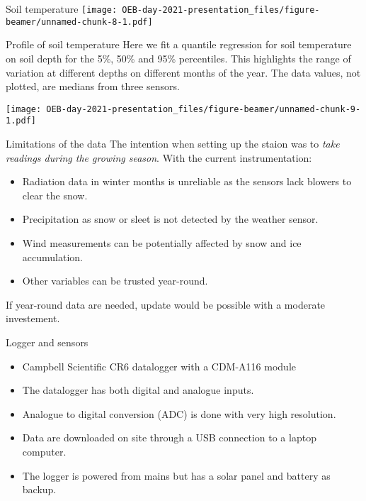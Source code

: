 \documentclass[
  ignorenonframetext,
]{beamer}
\providecommand{\tightlist}{%
  \setlength{\itemsep}{0pt}\setlength{\parskip}{0pt}}
\begin{document}
\begin{frame}{Soil temperature}
\protect\hypertarget{soil-temperature}{}
\texttt{[image: OEB-day-2021-presentation\_files/figure-beamer/unnamed-chunk-8-1.pdf]}
\end{frame}

\begin{frame}{Profile of soil temperature}
\protect\hypertarget{profile-of-soil-temperature}{}
Here we fit a quantile regression for soil temperature on soil depth for
the 5\%, 50\% and 95\% percentiles. This highlights the range of
variation at different depths on different months of the year. The data
values, not plotted, are medians from three sensors.

\texttt{[image: OEB-day-2021-presentation\_files/figure-beamer/unnamed-chunk-9-1.pdf]}
\end{frame}

\begin{frame}{Limitations of the data}
\protect\hypertarget{limitations-of-the-data}{}
The intention when setting up the staion was to \emph{take readings
during the growing season}. With the current instrumentation:

\begin{itemize}
\tightlist
\item
  Radiation data in winter months is unreliable as the sensors lack
  blowers to clear the snow.
\item
  Precipitation as snow or sleet is not detected by the weather sensor.
\item
  Wind measurements can be potentially affected by snow and ice
  accumulation.
\item
  Other variables can be trusted year-round.
\end{itemize}

If year-round data are needed, update would be possible with a moderate
investement.
\end{frame}

\begin{frame}{Logger and sensors}
\protect\hypertarget{logger-and-sensors}{}
\begin{itemize}
\tightlist
\item
  Campbell Scientific CR6 datalogger with a CDM-A116 module
\item
  The datalogger has both digital and analogue inputs.
\item
  Analogue to digital conversion (ADC) is done with very high
  resolution.
\item
  Data are downloaded on site through a USB connection to a laptop
  computer.
\item
  The logger is powered from mains but has a solar panel and battery as
  backup.
\end{itemize}
\end{frame}
\end{document}
